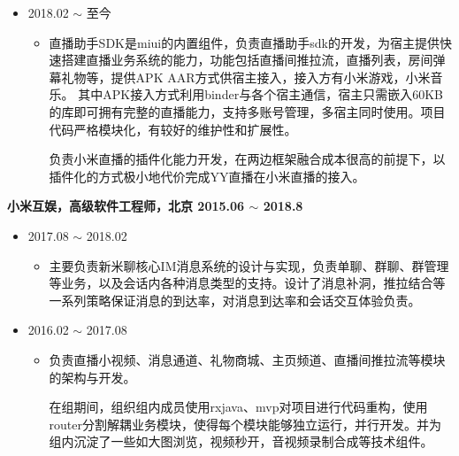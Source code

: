 \documentclass[line,margin,UTF8]{res}
\begin{document}
\begin{resume}
  \begin{itemize}
 \item {} 2018.02 $\sim$ 至今
 	\vspace{-3pt}
 	\begin{itemize}
 		\item 
 		直播助手SDK是miui的内置组件，负责直播助手sdk的开发，为宿主提供快速搭建直播业务系统的能力，功能包括直播间推拉流，直播列表，房间弹幕礼物等，提供APK AAR方式供宿主接入，接入方有小米游戏，小米音乐。
 		其中APK接入方式利用binder与各个宿主通信，宿主只需嵌入60KB的库即可拥有完整的直播能力，支持多账号管理，多宿主同时使用。项目代码严格模块化，有较好的维护性和扩展性。

 		负责小米直播的插件化能力开发，在两边框架融合成本很高的前提下，以插件化的方式极小地代价完成YY直播在小米直播的接入。
 \end{itemize}
 \end{itemize}


{\bf 小米互娱，高级软件工程师，北京 \hfill  2015.06 $\sim$ 2018.8}
 \vspace{3pt}

 \begin{itemize}
 \item {} 2017.08 $\sim$ 2018.02
 	\vspace{-3pt}
 	\begin{itemize}
 		\item 
 		主要负责新米聊核心IM消息系统的设计与实现，负责单聊、群聊、群管理等业务，以及会话内各种消息类型的支持。设计了消息补洞，推拉结合等一系列策略保证消息的到达率，对消息到达率和会话交互体验负责。

 \end{itemize}
 \end{itemize}

 \begin{itemize}
 \item {} 2016.02 $\sim$ 2017.08
 	\vspace{-3pt}
 	\begin{itemize}
 		\item 
 		负责直播小视频、消息通道、礼物商城、主页频道、直播间推拉流等模块的架构与开发。
 		
 		在组期间，组织组内成员使用rxjava、mvp对项目进行代码重构，使用router分割解耦业务模块，使得每个模块能够独立运行，并行开发。并为组内沉淀了一些如大图浏览，视频秒开，音视频录制合成等技术组件。



\end{itemize}
\end{itemize}
\end{resume}
\end{document}
